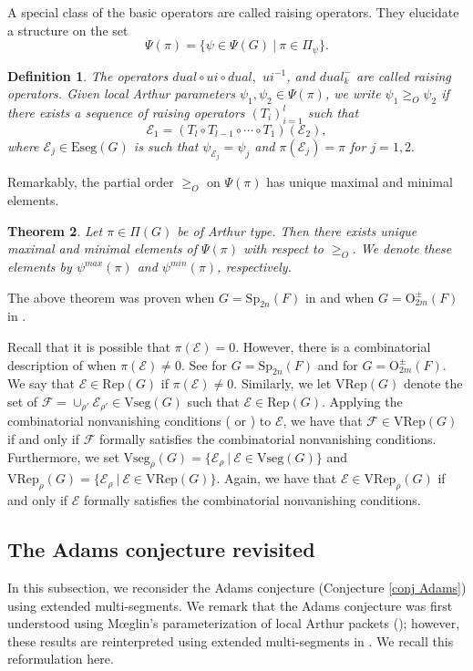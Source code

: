 \documentclass[11pt,letterpaper]{amsart}
\newcommand{\Eseg}{{\mathrm{Eseg}}}
\newcommand{\Vseg}{{\mathrm{Vseg}}}
\newcommand{\Rep}{{\mathrm{Rep}}}
\newcommand{\VRep}{{\mathrm{VRep}}}
\newcommand{\OO}{\mathrm{O}}
\newcommand{\Sp}{\mathrm{Sp}}
\newcommand{\EE}{\mathcal{E}}
\newtheorem{thm}{Theorem}[section]
\newtheorem{defn}[thm]{Definition}
\numberwithin{equation}{section}
\begin{document}
A special class of the basic operators are called raising operators. They elucidate a structure on the set
\[
\Psi(\pi)=\{\psi\in\Psi(G) \ | \ \pi\in\Pi_\psi\}.
\]

\begin{defn}\label{defn raising operators}
    The operators $dual\circ ui \circ dual,$ $ui^{-1}$, and $dual_k^-$ are called \emph{raising operators}. Given local Arthur parameters $\psi_1, \psi_2\in\Psi(\pi)$, we write $\psi_1\geq_O\psi_2$ if there exists a sequence of raising operators $(T_i)_{i=1}^l$ such that \[\EE_1=(T_l\circ T_{l-1}\circ\cdots\circ T_1)(\EE_2),\] where $\EE_j\in\Eseg(G)$ is such that $\psi_{\EE_j}=\psi_j$ and $\pi(\EE_j)=\pi$ for $j=1,2.$ 
\end{defn}

Remarkably, the partial order $\geq_O$ on $\Psi(\pi)$ has unique maximal and minimal elements.

\begin{thm}\label{thm psi max min}
    Let $\pi\in\Pi(G)$ be of Arthur type. Then there exists unique maximal and minimal elements of $\Psi(\pi)$ with respect to $\geq_O.$ We denote these elements by $\psi^{max}(\pi)$ and $\psi^{min}(\pi)$, respectively.
\end{thm}

The above theorem was proven when $G=\Sp_{2n}(F)$ in \cite[Theorem 1.7]{HLL22} and when $G=\OO_{2m}^\pm(F)$ in \cite[Theorem 7.3]{HLL25}.

Recall that it is possible that $\pi(\EE)=0.$ However, there is a combinatorial description of when $\pi(\EE)\neq 0$. See \cite[Theorems 3.6, 4.4]{Ato20b} for $G=\Sp_{2n}(F)$ and \cite[Theorem 6.17]{HLL25} for $G=\OO_{2m}^\pm(F)$.
We say that $\EE\in\Rep(G)$ if $\pi(\EE)\neq 0$. Similarly, we let $\VRep(G)$ denote the set of $\mathcal{F}=\cup_{\rho'}\EE_{\rho'}\in \Vseg(G)$ such that $\EE\in\Rep(G).$ Applying the combinatorial nonvanishing conditions (\cite[Theorems 3.6, 4.4]{Ato20b} or \cite[Theorem 6.17]{HLL25}) to $\EE$, we have that $\mathcal{F}\in \VRep(G)$ if and only if $\mathcal{F}$ formally satisfies the combinatorial nonvanishing conditions. Furthermore, we set $\Vseg_\rho(G)=\{\EE_\rho \ | \ \EE\in \Vseg(G)\}$ and $\VRep_\rho(G)=\{\EE_\rho \ | \ \EE\in \VRep(G)\}$. Again, we have that $\mathcal{E}\in \VRep_\rho(G)$ if and only if $\mathcal{E}$ formally satisfies the combinatorial nonvanishing conditions.



\subsection{The Adams conjecture revisited} 
In this subsection, we reconsider the Adams conjecture (Conjecture \ref{conj Adams}) using extended multi-segments. We remark that the Adams conjecture was first understood using M{\oe}glin's parameterization of local Arthur packets (\cite{BH22, Haz24,  Moe11c}); however, these results are reinterpreted using extended multi-segments in \cite{HLL25}. We recall this reformulation here.
\end{document}
